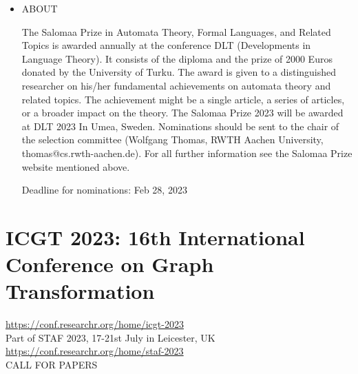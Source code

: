 \documentclass[prodmode,acmtecs]{acmsmall} %
\begin{document}
\begin{itemize}\item  ABOUT  
 
  The Salomaa Prize in Automata Theory, Formal Languages, and Related Topics is awarded annually at the conference DLT (Developments in Language Theory). It consists of the diploma and the prize of 2000 Euros donated by the University of Turku. The award is given to a distinguished researcher on his/her fundamental achievements on automata theory and related topics. The achievement might be a single article, a series of articles, or a broader impact on the theory. The Salomaa Prize 2023 will be awarded at DLT 2023 In Umea, Sweden. Nominations should be sent to the chair of the selection committee (Wolfgang Thomas, RWTH Aachen University, thomas@cs.rwth-aachen.de). For all further information see the Salomaa Prize website mentioned above.  
 
Deadline for nominations: Feb 28, 2023 
 
\end{itemize}\section{ICGT 2023: 16th International Conference on Graph Transformation}\label{ICGT2023}  \href{https://conf.researchr.org/home/icgt-2023}{https://conf.researchr.org/home/icgt-2023}\\ 
  Part of STAF 2023, 17-21st July in Leicester, UK\\ 
  \href{https://conf.researchr.org/home/staf-2023}{https://conf.researchr.org/home/staf-2023}\\ 
CALL FOR PAPERS 
\end{document}
